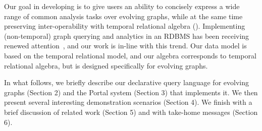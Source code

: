 Our goal in developing \tga is to give users an ability to concisely
express a wide range of common analysis tasks over evolving graphs,
while at the same time preserving inter-operability with temporal
relational algebra (\tra).  Implementing (non-temporal) graph querying
and analytics in an RDBMS has been receiving renewed
attention~\cite{DBLP:conf/sigmod/AbergerTOR16,DBLP:conf/sigmod/SunFSKHX15,DBLP:journals/pvldb/Xirogiannopoulos15},
and our work is in-line with this trend. Our data model is based on
the temporal relational model, and our algebra corresponds to temporal
relational algebra, but is designed specifically for evolving graphs.

In what follows, we briefly describe our declarative query
language for evolving graphs (Section 2) and the Portal system
(Section 3) that implements it. We then present several
interesting demonstration scenarios (Section 4). We finish
with a brief discussion of related work (Section 5) and with
take-home messages (Section 6).


